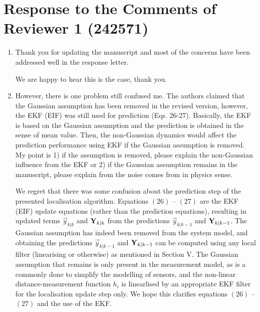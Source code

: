 \documentclass[a4paper]{scrartcl}
\newenvironment{rebuttal}{\begin{enumerate}[label={\color{grey}\thesection.\arabic{enumi}},leftmargin=0pt,ref=\thesection.\arabic{enumi}]}{\end{enumerate}}
\newcommand{\reviewtext}[1]{{\color{nblue} #1}}
\begin{document}
\section*{Response to the Comments of Reviewer 1 (242571)}
\def\thesection{R1}
\begin{rebuttal}
\item \reviewtext{Thank you for updating the manuscript and most of the concerns have been addressed well in the response letter.}

We are happy to hear this is the case, thank you.

\item \reviewtext{However, there is one problem still confused me. The authors claimed that the Gaussian assumption has been removed in the revised version, however, the EKF (EIF) was still used for prediction (Eqs. 26-27). Basically, the EKF is based on the Gaussian assumption and the prediction is obtained in the sense of mean value. Then, the non-Gaussian dynamics would affect the prediction performance using EKF if the Gaussian assumption is removed. My point is 1) if the assumption is removed, please explain the non-Gaussian influence from the EKF or 2) if the Gaussian assumption remains in the manuscript, please explain from the noise comes from in physics sense.}

We regret that there was some confusion about the prediction step of the presented localisation algorithm. Equations $(26)$ -- $(27)$ are the EKF (EIF) update equations (rather than the prediction equations), resulting in updated terms $\vec{y}_{k|k}$ and ${{\mathbf{Y}}}_{k|k}$ from the predictions $\vec{y}_{k|k-1}$ and ${{\mathbf{Y}}}_{k|k-1}$. The Gaussian assumption has indeed been removed from the system model, and obtaining the predictions $\vec{y}_{k|k-1}$ and ${{\mathbf{Y}}}_{k|k-1}$ can be computed using any local filter (linearising or otherwise) as mentioned in Section V. The Gaussian assumption that remains is only present in the measurement model, as is a commonly done to simplify the modelling of sensors, and the non-linear distance-measurement function $h_i$ is linearlised by an appropriate EKF filter for the localisation update step only. We hope this clarifies equations $(26)$ -- $(27)$ and the use of the EKF.

\end{rebuttal}

\end{document}
